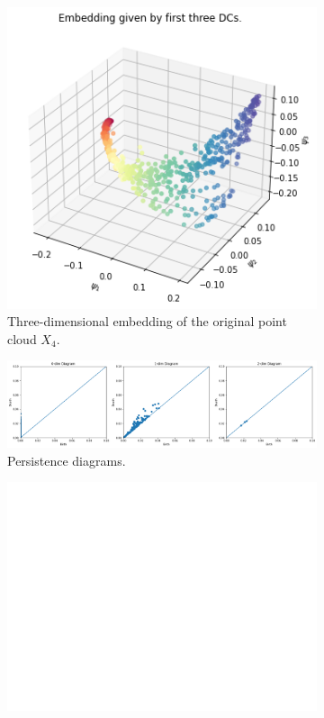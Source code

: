 \begin{figure}[H]
\centering
\begin{subfigure}[b]{0.2\textwidth}
    \includegraphics[width=\textwidth]{figures/X4_embedding.png}
    \caption{Three-dimensional embedding of the original point cloud $X_4$.}
\end{subfigure}
\hfill
\begin{subfigure}[b]{0.75\textwidth}
    \includegraphics[width=\textwidth]{figures/X4_H0.png}
    \caption{Persistence diagrams.}
\end{subfigure}
\begin{subfigure}[b]{0.25\textwidth}
\includegraphics[width=\textwidth]{figures/white.png} 

\end{subfigure}
\end{figure}
